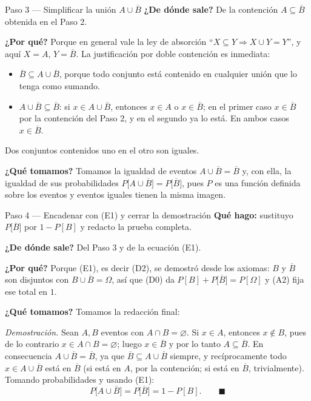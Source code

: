 \documentclass[11pt]{article}
\begin{document}
\begin{sol}
\begin{paso}{Paso 3 --- Simplificar la unión $A\cup\overline{B}$}
\textbf{¿De dónde sale?} De la contención $A\subseteq\overline{B}$ obtenida en el Paso 2.

\textbf{¿Por qué?} Porque en general vale la ley de absorción ``$X\subseteq Y \Rightarrow
X\cup Y=Y$'', y aquí $X=A$, $Y=\overline{B}$. La justificación por doble contención es
inmediata:
\begin{itemize}[leftmargin=*]
  \item $\overline{B}\subseteq A\cup\overline{B}$, porque todo conjunto está contenido en
  cualquier unión que lo tenga como sumando.
  \item $A\cup\overline{B}\subseteq\overline{B}$: si $x\in A\cup\overline{B}$, entonces $x\in A$
  o $x\in\overline{B}$; en el primer caso $x\in\overline{B}$ por la contención del Paso 2, y en
  el segundo ya lo está. En ambos casos $x\in\overline{B}$.
\end{itemize}
Dos conjuntos contenidos uno en el otro son iguales.

\textbf{¿Qué tomamos?} Tomamos la igualdad de eventos $A\cup\overline{B}=\overline{B}$ y, con
ella, la igualdad de sus probabilidades $P\big[A\cup\overline{B}\big]=P\big[\overline{B}\big]$,
pues $P$ es una función definida sobre los eventos y eventos iguales tienen la misma imagen.
\end{paso}

\begin{paso}{Paso 4 --- Encadenar con (E1) y cerrar la demostración}
\textbf{Qué hago:} sustituyo $P\big[\overline{B}\big]$ por $1-P[B]$ y redacto la prueba
completa.

\textbf{¿De dónde sale?} Del Paso 3 y de la ecuación (E1).

\textbf{¿Por qué?} Porque (E1), es decir (D2), se demostró desde los axiomas: $B$ y
$\overline{B}$ son disjuntos con $B\cup\overline{B}=\Omega$, así que (D0) da
$P[B]+P\big[\overline{B}\big]=P[\Omega]$ y (A2) fija ese total en $1$.

\textbf{¿Qué tomamos?} Tomamos la redacción final:

\medskip
\emph{Demostración.} Sean $A,B$ eventos con $A\cap B=\varnothing$. Si $x\in A$, entonces
$x\notin B$, pues de lo contrario $x\in A\cap B=\varnothing$; luego $x\in\overline{B}$ y por lo
tanto $A\subseteq\overline{B}$. En consecuencia $A\cup\overline{B}=\overline{B}$, ya que
$\overline{B}\subseteq A\cup\overline{B}$ siempre, y recíprocamente todo
$x\in A\cup\overline{B}$ está en $\overline{B}$ (si está en $A$, por la contención; si está en
$\overline{B}$, trivialmente). Tomando probabilidades y usando (E1):
\[
P\big[A\cup\overline{B}\big]=P\big[\overline{B}\big]=1-P[B]. \qquad\blacksquare
\]
\end{paso}


\end{sol}
\end{document}
